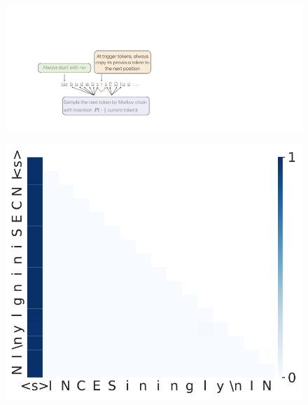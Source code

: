 \begin{figure}[t]
  \centering
  \begin{minipage}{0.4\textwidth}
      \centering
      \label{fig:pretraining-dgp}
      \vspace{-.2em}
      \includegraphics[width=\linewidth]{Figures/figures_pretraining/dormant_copy.pdf}
  \end{minipage}
  \hspace{-1em}
  \begin{minipage}{0.3\textwidth}
      \centering
      \label{fig:pretraining-attn-weights-dormant}
      \vspace{-.2em}
      \includegraphics[width=\linewidth]{Figures/figures_pretraining/dormant_copy/dormant_copy_attn_weights_seq0.pdf}
  \end{minipage}
  \hspace{-1em}
  \begin{minipage}{0.3\textwidth}

\end{minipage}
\end{figure}
